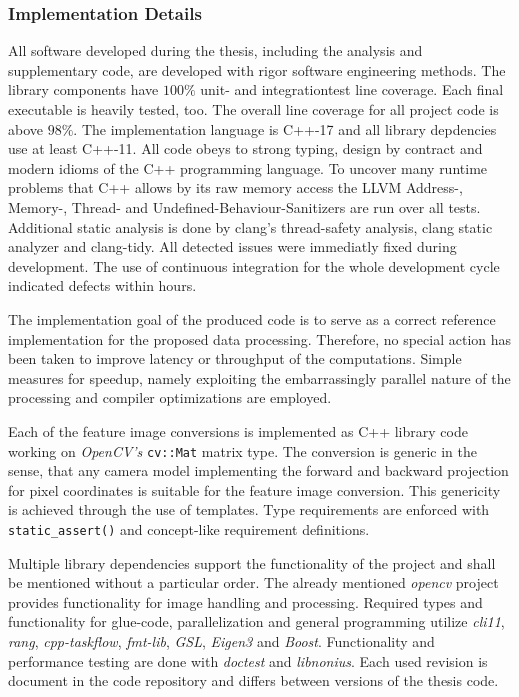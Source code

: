 \subsubsection{Implementation Details}

All software developed during the thesis, including the analysis and supplementary code, are developed with rigor software engineering methods.
The library components have $100\%$ unit- and integrationtest line coverage.
Each final executable is heavily tested, too.
The overall line coverage for all project code is above $98\%$.
The implementation language is C++-17\cite{c++17} and all library depdencies use at least C++-11\cite{c++11}.
All code obeys to strong typing, design by contract\cite{meyer_ieee1992} and modern idioms of the C++ programming language\cite{stroustrup_cpppl2013}.
To uncover many runtime problems that C++ allows by its raw memory access the LLVM Address-, Memory-, Thread- and Undefined-Behaviour-Sanitizers\cite{google_sanitizers} are run over all tests.
Additional static analysis is done by clang's thread-safety analysis\cite{clang_thread_safety}, clang static analyzer\cite{clang_static_analyzer} and clang-tidy\cite{babati2017static}.
All detected issues were immediatly fixed during development.
The use of continuous integration\cite{fowler_ci2000} for the whole development cycle indicated defects within hours.

The implementation goal of the produced code is to serve as a correct reference implementation for the proposed data processing.
Therefore, no special action has been taken to improve latency or throughput of the computations.
Simple measures for speedup, namely exploiting the embarrassingly parallel nature of the processing and compiler optimizations are employed.

Each of the feature image conversions is implemented as C++ library code working on \emph{OpenCV's} \lstinline[basicstyle=\ttfamily]|cv::Mat| matrix type.
The conversion is generic in the sense, that any camera model implementing the forward and backward projection for pixel coordinates is suitable for the feature image conversion.
This genericity is achieved through the use of templates.
Type requirements are enforced with \lstinline[basicstyle=\ttfamily]|static_assert()| and concept-like\cite{c++concepts} requirement definitions.

Multiple library dependencies support the functionality of the project and shall be mentioned without a particular order.
The already mentioned \emph{opencv}\cite{opencv_library} project provides functionality for image handling and processing. 
Required types and functionality for glue-code, parallelization and general programming utilize \emph{cli11}\cite{cli11}, \emph{rang}\cite{rang}, \emph{cpp-taskflow}\cite{Huang2019CppTaskflowFT}, \emph{fmt-lib}\cite{fmtlib}, \emph{GSL}\cite{gsl}, \emph{Eigen3}\cite{eigenweb} and \emph{Boost}\cite{boost}.
Functionality and performance testing are done with \emph{doctest}\cite{doctest} and \emph{libnonius}\cite{libnonius}.
Each used revision is document in the code repository and differs between versions of the thesis code.
